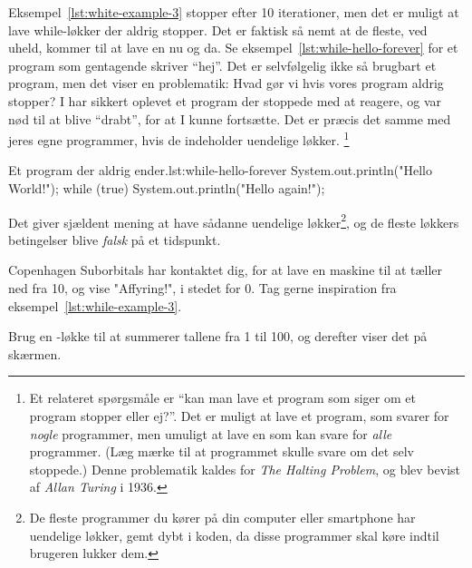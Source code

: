         Eksempel~\ref{lst:white-example-3} stopper efter 10
        iterationer, men det er muligt at lave while-løkker der aldrig
        stopper.  Det er faktisk så nemt at de fleste, ved uheld,
        kommer til at lave en nu og da. Se
        eksempel~\ref{lst:while-hello-forever} for et program som
        gentagende skriver ``hej''. Det er selvfølgelig ikke så
        brugbart et program, men det viser en problematik: Hvad gør vi
        hvis vores program aldrig stopper? I har sikkert oplevet et
        program der stoppede med at reagere, og var nød til at blive
        ``drabt'', for at I kunne fortsætte. Det er præcis det samme
        med jeres egne programmer, hvis de indeholder uendelige
        løkker. \footnote{Et relateret spørgsmåle er ``kan man lave et
        program som siger om et program stopper eller ej?''. Det er
        muligt at lave et program, som svarer for \emph{nogle}
        programmer, men umuligt at lave en som kan svare for
        \emph{alle} programmer.  (Læg mærke til at programmet skulle
        svare om det selv stoppede.) Denne problematik kaldes for
        \emph{The Halting Problem}, og blev bevist af \emph{Allan
        Turing} i 1936.}

		\begin{JavaCode}{Et program der aldrig ender.}{lst:while-hello-forever}
			System.out.println("Hello World!");
			while (true) {
				System.out.println("Hello again!");
			}
		\end{JavaCode}

        Det giver sjældent mening at have sådanne uendelige
        løkker\footnote{De fleste programmer du kører på din computer
        eller smartphone har uendelige løkker, gemt dybt i koden, da
        disse programmer skal køre indtil brugeren lukker dem.}, og de
        fleste løkkers betingelser blive \emph{falsk} på et
        tidspunkt.

		\begin{exercise}
			Copenhagen Suborbitals har kontaktet dig, for at lave en maskine til
            at tæller ned fra 10, og vise "Affyring!", i stedet for 0.
            Tag gerne inspiration fra
            eksempel~\ref{lst:while-example-3}.
		\end{exercise}

		\begin{exercise}
            Brug en -løkke til at summerer tallene
            fra 1 til 100, og derefter viser det på skærmen.
		\end{exercise}

